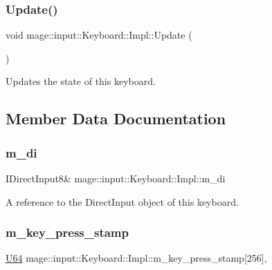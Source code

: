 \subsubsection{\texorpdfstring{Update()}{Update()}}
{\footnotesize\ttfamily void mage\+::input\+::\+Keyboard\+::\+Impl\+::\+Update (\begin{DoxyParamCaption}{ }\end{DoxyParamCaption})\hspace{0.3cm}{\ttfamily [noexcept]}}

Updates the state of this keyboard. 

\subsection{Member Data Documentation}
\hypertarget{classmage_1_1input_1_1_keyboard_1_1_impl_a87c2eeea3ea7fdaa56cbb6f46235d2e5}{}\label{classmage_1_1input_1_1_keyboard_1_1_impl_a87c2eeea3ea7fdaa56cbb6f46235d2e5} 
\subsubsection{\texorpdfstring{m\+\_\+di}{m\_di}}
{\footnotesize\ttfamily I\+Direct\+Input8\& mage\+::input\+::\+Keyboard\+::\+Impl\+::m\+\_\+di\hspace{0.3cm}{\ttfamily [private]}}

A reference to the Direct\+Input object of this keyboard. \hypertarget{classmage_1_1input_1_1_keyboard_1_1_impl_aac27a1a8210f933a9e0598ce8a0fc2cb}{}\label{classmage_1_1input_1_1_keyboard_1_1_impl_aac27a1a8210f933a9e0598ce8a0fc2cb} 
\subsubsection{\texorpdfstring{m\+\_\+key\+\_\+press\+\_\+stamp}{m\_key\_press\_stamp}}
{\footnotesize\ttfamily \hyperlink{namespacemage_a6672cf3c861707ce4a3235a3eb43941d}{U64} mage\+::input\+::\+Keyboard\+::\+Impl\+::m\+\_\+key\+\_\+press\+\_\+stamp\mbox{[}256\mbox{]}\hspace{0.3cm}{\ttfamily [mutable]}, {\ttfamily [private]}}


